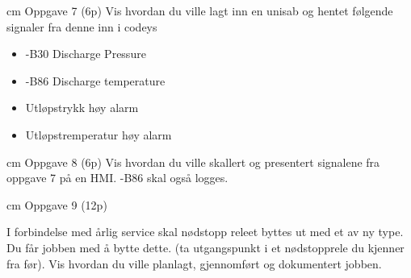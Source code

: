  cm
Oppgave 7 (6p) %
\vskip 2.5pt 
Vis hvordan du ville lagt inn en unisab og hentet følgende signaler fra denne inn i codeys
\begin{itemize}[noitemsep]
	\item -B30 Discharge Pressure
	\item -B86 Discharge temperature
	\item Utløpstrykk høy alarm
	\item Utløpstremperatur høy alarm
\end{itemize}


 cm
Oppgave 8 (6p)
\vskip 2.5pt 
Vis hvordan du ville skallert og presentert signalene fra oppgave 7 på en HMI. -B86 skal også logges. 


 cm
Oppgave 9 (12p)

\vskip 5pt 
I forbindelse med årlig service skal nødstopp releet byttes ut med et av ny type. Du får jobben med å bytte dette. (ta utgangspunkt i et nødstopprele du kjenner fra før). 
\vskip 10pt 
Vis hvordan du ville planlagt, gjennomført og dokumentert jobben. 


